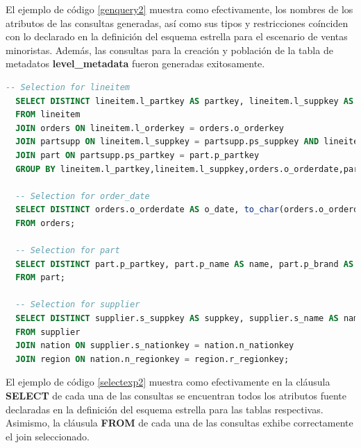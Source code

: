 El ejemplo de c\'odigo \ref{genquery2} muestra como efectivamente, los nombres de los atributos 
de las consultas generadas, as\'i como sus tipos y restricciones co\'inciden con lo declarado en la definición 
del esquema estrella para el escenario de ventas minoristas. Además, las consultas para la creación y 
población de la tabla de metadatos \textbf{level\_metadata} fueron generadas exitosamente.

\begin{lstlisting}[label={selectexp2}, caption={Consultas de selecci\'on generadas para el experimento 2}, language={sql}]
  -- Selection for lineitem
  SELECT DISTINCT lineitem.l_partkey AS partkey, lineitem.l_suppkey AS supplierkey, orders.o_orderdate AS order_date, SUM(lineitem.l_payment) AS totalpayment, SUM(lineitem.l_quantity) AS totalquantity, SUM(lineitem.l_payment)-(SUM(lineitem.l_quantity)*partsupp.ps_supplycost)-(SUM(lineitem.l_quantity)*part.p_retailprice) AS earnings
  FROM lineitem
  JOIN orders ON lineitem.l_orderkey = orders.o_orderkey
  JOIN partsupp ON lineitem.l_suppkey = partsupp.ps_suppkey AND lineitem.l_partkey = partsupp.ps_partkey
  JOIN part ON partsupp.ps_partkey = part.p_partkey
  GROUP BY lineitem.l_partkey,lineitem.l_suppkey,orders.o_orderdate,partsupp.ps_supplycost,part.p_retailprice;

  -- Selection for order_date
  SELECT DISTINCT orders.o_orderdate AS o_date, to_char(orders.o_orderdate, 'Day') AS day, to_char(orders.o_orderdate, 'Month') AS month
  FROM orders;

  -- Selection for part 
  SELECT DISTINCT part.p_partkey, part.p_name AS name, part.p_brand AS brand, part.p_size, part.p_retailprice
  FROM part;

  -- Selection for supplier 
  SELECT DISTINCT supplier.s_suppkey AS suppkey, supplier.s_name AS name, supplier.s_phone AS phone, supplier.s_address AS address, nation.n_name AS nation, region.r_name AS region
  FROM supplier
  JOIN nation ON supplier.s_nationkey = nation.n_nationkey
  JOIN region ON nation.n_regionkey = region.r_regionkey;
\end{lstlisting}

El ejemplo de c\'odigo \ref{selectexp2} muestra como efectivamente en la cl\'ausula \textbf{SELECT} 
de cada una de las consultas se encuentran todos los atributos fuente declaradas en la definición 
del esquema estrella para las tablas respectivas. Asimismo, la cl\'ausula \textbf{FROM} de cada 
una de las consultas exhibe correctamente  el join seleccionado.

